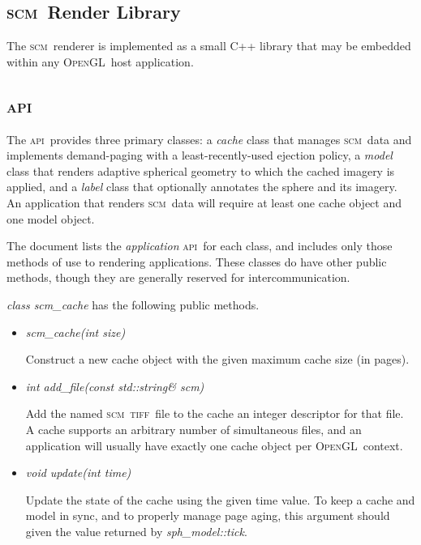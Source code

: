 \documentclass[oneside,10pt]{memoir}
\newcommand{\opengl}  {\textsc{OpenGL}}
\newcommand{\scm}     {\textsc{scm}}
\newcommand{\tiff}    {\textsc{tiff}}
\newcommand{\api}     {\textsc{api}}
\begin{document}
\begin{Spacing}{1.1}

\chapter{\scm\ Render Library}

The \scm\ renderer is implemented as a small C++ library that may be embedded within any \opengl\ host application.

\section{\api}
\label{sec:api}

The \api\ provides three primary classes: a \emph{cache} class that manages \scm\ data and implements demand-paging with a least-recently-used ejection policy, a \emph{model} class that renders adaptive spherical geometry to which the cached imagery is applied, and a \emph{label} class that optionally annotates the sphere and its imagery. An application that renders \scm\ data will require at least one cache object and one model object.

The document lists the \emph{application} \api\ for each class, and includes only those methods of use to rendering applications. These classes do have other public methods, though they are generally reserved for intercommunication.

\bigskip\noindent\textit{class scm\_cache} has the following public methods.

\begin{itemize}
  \item\textit{scm\_cache(int size)}

    Construct a new cache object with the given maximum cache size (in pages).

  \item \textit{int add\_file(const std::string\& scm)}

    Add the named \scm\ \tiff\ file to the cache an integer descriptor for that file. A cache supports an arbitrary number of simultaneous files, and an application will usually have exactly one cache object per \opengl\ context.

  \item\textit{void update(int time)}

    Update the state of the cache using the given time value. To keep a cache and model in sync, and to properly manage page aging, this argument should given the value returned by \textit{sph\_model::tick}.


\end{itemize}
\end{Spacing}
\end{document}
